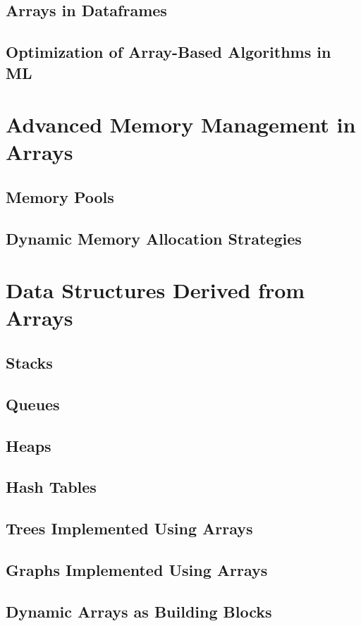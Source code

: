 \documentclass[12pt, oneside]{book}
\begin{document}
\section{Arrays in Dataframes}
\section{Optimization of Array-Based Algorithms in ML}

\chapter{Advanced Memory Management in Arrays}
\section{Memory Pools}
\section{Dynamic Memory Allocation Strategies}

\chapter{Data Structures Derived from Arrays}
\section{Stacks}
\section{Queues}
\section{Heaps}
\section{Hash Tables}
\section{Trees Implemented Using Arrays}
\section{Graphs Implemented Using Arrays}
\section{Dynamic Arrays as Building Blocks}
\end{document}
